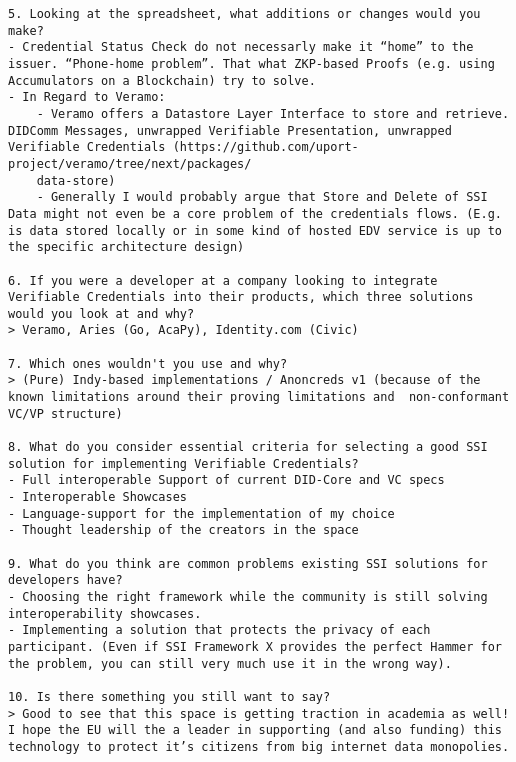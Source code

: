 \begin{Verbatim}[breaklines=true, breaksymbol={}, breaksymbolsepleftnchars=2]
5. Looking at the spreadsheet, what additions or changes would you make?
- Credential Status Check do not necessarly make it “home” to the issuer. “Phone-home problem”. That what ZKP-based Proofs (e.g. using Accumulators on a Blockchain) try to solve.
- In Regard to Veramo: 
	- Veramo offers a Datastore Layer Interface to store and retrieve. DIDComm Messages, unwrapped Verifiable Presentation, unwrapped Verifiable Credentials (https://github.com/uport-project/veramo/tree/next/packages/
	data-store)
	- Generally I would probably argue that Store and Delete of SSI Data might not even be a core problem of the credentials flows. (E.g. is data stored locally or in some kind of hosted EDV service is up to the specific architecture design)
	
6. If you were a developer at a company looking to integrate Verifiable Credentials into their products, which three solutions would you look at and why?
> Veramo, Aries (Go, AcaPy), Identity.com (Civic)

7. Which ones wouldn't you use and why?
> (Pure) Indy-based implementations / Anoncreds v1 (because of the known limitations around their proving limitations and  non-conformant VC/VP structure)

8. What do you consider essential criteria for selecting a good SSI solution for implementing Verifiable Credentials?
- Full interoperable Support of current DID-Core and VC specs
- Interoperable Showcases
- Language-support for the implementation of my choice
- Thought leadership of the creators in the space

9. What do you think are common problems existing SSI solutions for developers have? 
- Choosing the right framework while the community is still solving interoperability showcases. 
- Implementing a solution that protects the privacy of each participant. (Even if SSI Framework X provides the perfect Hammer for the problem, you can still very much use it in the wrong way).

10. Is there something you still want to say?
> Good to see that this space is getting traction in academia as well! I hope the EU will the a leader in supporting (and also funding) this technology to protect it’s citizens from big internet data monopolies.
\end{Verbatim}

